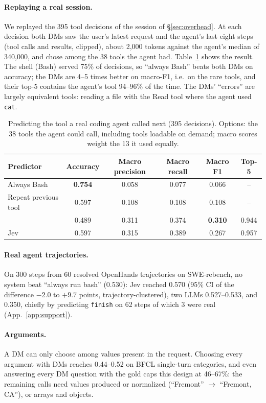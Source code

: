 \paragraph{Replaying a real session.} We replayed the 395 tool decisions of the session of \S\ref{sec:overhead}. At each decision both
DMs saw the user's latest request and the agent's last eight steps (tool calls and results, clipped), about
2{,}000 tokens against the agent's median of 340{,}000, and chose among the 38 tools the agent had.
Table~\ref{tab:replay} shows the result. The shell (Bash) served 75\% of decisions, so ``always Bash'' beats
both DMs on accuracy; the DMs are 4--5 times better on macro-F1, i.e.\ on the rare tools, and their top-5
contains the agent's tool 94--96\% of the time. The DMs' ``errors'' are largely equivalent tools: reading a
file with the Read tool where the agent used \texttt{cat}.

\begin{table}[t]
\centering\small
\caption{Predicting the tool a real coding agent called next (395 decisions). Options: the 38 tools the agent
could call, including tools loadable on demand; macro scores weight the 13 it used equally.}
\label{tab:replay}
\begin{tabular}{@{}lccccc@{}}
\toprule
Predictor & Accuracy & Macro precision & Macro recall & Macro F1 & Top-5 \\
\midrule
Always Bash & \textbf{0.754} & 0.058 & 0.077 & 0.066 & -- \\
Repeat previous tool & 0.597 & 0.108 & 0.108 & 0.108 & -- \\
\msd{} & 0.489 & 0.311 & 0.374 & \textbf{0.310} & 0.944 \\
Jev & 0.597 & 0.315 & 0.389 & 0.267 & 0.957 \\
\bottomrule
\end{tabular}
\end{table}

\paragraph{Real agent trajectories.} On 300 steps from 60 resolved OpenHands trajectories on SWE-rebench, no
system beat ``always run bash'' (0.530): Jev reached 0.570 (95\% CI of the difference $-2.0$ to $+9.7$
points, trajectory-clustered), two LLMs 0.527--0.533, and \msd{} 0.350, chiefly by predicting \texttt{finish}
on 62 steps of which 3 were real (App.~\ref{app:support}).

\paragraph{Arguments.} A DM can only choose among values present in the request. Choosing every argument with
DMs reaches 0.44--0.52 on BFCL single-turn categories, and even answering every DM question with the gold
caps this design at 46--67\%: the remaining calls need values produced or normalized (``Fremont'' $\to$
``Fremont, CA''), or arrays and objects.

